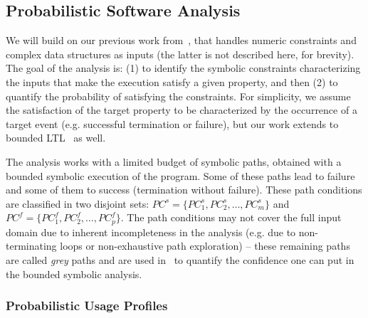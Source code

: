 \subsection{Probabilistic Software Analysis} 
%
We will build on our previous work
from~\cite{geldenhuys-etal-issta2012,filieri-etal-icse2013,Borges2014PLDI}, that handles numeric constraints and
complex data structures as inputs (the latter is not described here,
for brevity). The goal of the analysis is: (1) to identify the 
symbolic constraints characterizing the inputs that make the 
execution satisfy a given property, and then (2) to quantify the 
probability of satisfying the constraints.
For simplicity, we assume the satisfaction of the target property to be 
characterized by the occurrence of a target event (e.g. successful 
termination or failure), but our work extends to bounded 
LTL~\cite{Zuliani2010} as well. 


The analysis works with a limited budget of symbolic paths, obtained with a bounded symbolic execution of the program. 
 Some of these paths lead to
failure and some of them to success (termination without failure). 
These path conditions are classified in two disjoint sets: 
$\textit{PC}^s=\{\textit{PC}_1^s, 
\textit{PC}_2^s, \ldots , \textit{PC}_m^s\}$ and
$\textit{PC}^f=\{\textit{PC}_1^f, 
\textit{PC}_2^f, \ldots , \textit{PC}_p^f\}$.
The path conditions 
may not cover the full input domain due to inherent incompleteness in the analysis (e.g. due to non-terminating loops or non-exhaustive path exploration) -- these remaining paths are called  {\em grey} paths and are used in~\cite{filieri-etal-icse2013} to quantify the confidence one can put in the bounded symbolic analysis.

\subsubsection{Probabilistic Usage Profiles} 

